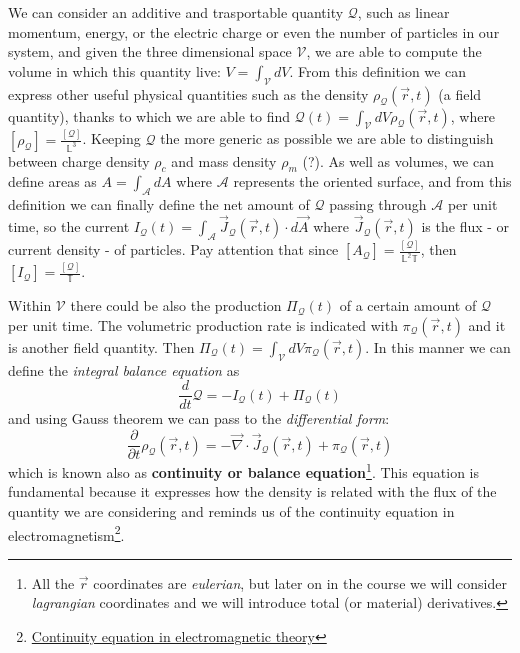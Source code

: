 \documentclass[../main/main.tex]{subfiles}
\begin{document}
We can consider an additive and trasportable quantity $\mathcal{Q}$, such as linear momentum, energy, or the electric charge or even the number of particles in our system, and given the three dimensional space $\mathcal{V}$, we are able to compute the volume in which this quantity live: $V=\int_{\mathcal{V}}dV$. From this definition we can express other useful physical quantities such as the density $\rho_{\mathcal{Q}}(\vec{r}, t)$ (a field quantity), thanks to which we are able to find $\mathcal{Q}(t)=\int_{\mathcal{V}}dV\rho_{\mathcal{Q}}(\vec{r}, t)$, where
$[\rho_{\mathcal{Q}}]=\frac{[\mathcal{Q}]}{\mathbb{L}^3}$. Keeping $\mathcal{Q}$ the more generic as possible we are able to distinguish between charge density $\rho_c$ and mass density $\rho_m$ (?).
As well as volumes, we can define areas as $A=\int_{\mathcal{A}}dA$ where $\mathcal{A}$ represents the oriented surface, and from this definition we can finally define the net amount of $\mathcal{Q}$ passing through $\mathcal{A}$ per unit time, so the current $I_{\mathcal{Q}}(t)=\int_{\mathcal{A}}\vec{J}_{\mathcal{Q}}(\vec{r},t)\cdot d\vec{A}$ where $\vec{J}_{\mathcal{Q}}(\vec{r},t)$ is the flux - or current density - of particles. Pay attention that since $[A_{\mathcal{Q}}]=\frac{[\mathcal{Q}]}{\mathbb{L^2 T}}$, then $[I_{\mathcal{Q}}]=\frac{[\mathcal{Q}]}{\mathbb{T}}$.

Within $\mathcal{V}$ there could be also the production $\Pi_{\mathcal{Q}}(t)$ of a certain amount of $\mathcal{Q}$ per unit time. The volumetric production rate is indicated with $\pi_{\mathcal{Q}}(\vec{r},t)$ and it is another field quantity. Then $\Pi_{\mathcal{Q}}(t) = \int_{\mathcal{V}}dV\pi_{\mathcal{Q}}(\vec{r},t)$. In this manner we can define the \emph{integral balance equation} as $$\frac{d}{dt}\mathcal{Q}=-I_{\mathcal{Q}}(t)+\Pi_{\mathcal{Q}}(t)$$ and using Gauss theorem we can pass to the \emph{differential form}: 
\begin{equation}
    \frac{\partial}{\partial t}\rho_{\mathcal{Q}}(\vec{r},t)=-\vec{\nabla}\cdot\vec{J}_{\mathcal{Q}}(\vec{r},t)+\pi_{\mathcal{Q}}(\vec{r},t)
    \label{eq:balance_equation}
\end{equation}
which is known also as \textbf{continuity or balance equation}\footnote{All the $\vec{r}$ coordinates are \emph{eulerian}, but later on in the course we will consider \emph{lagrangian} coordinates and we will introduce total (or material) derivatives.}. This equation is fundamental because it expresses how the density is related with the flux of the quantity we are considering and reminds us of the continuity equation in electromagnetism\footnote{\href{https://en.wikipedia.org/wiki/Continuity_equation\#Differential_form}{Continuity equation in electromagnetic theory}}. 
\end{document}
